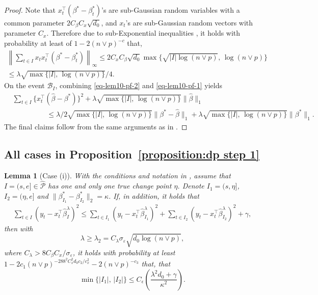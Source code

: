 \documentclass[twoside]{article}
\newtheorem{lemma}[theorem]{Lemma}
\begin{document}
\begin{proof}
Note that $x_t^{\top}(\beta^* - \beta^*_t)$'s are sub-Gaussian random variables with a common parameter $2C_{\beta}C_x\sqrt{d_0}$, and $x_t$'s are sub-Gaussian random vectors with parameter $C_x$.  Therefore due to sub-Exponential inequalities \citep[e.g. Proposition~2.7.1 in][]{vershynin2018high}, it holds with probability at least of $1 - 2(n \vee p)^{-c}$ that,
	\begin{align}
		\left\|\sum_{t \in I} x_t x_t^\top (\beta^*  -\beta^*_t) \right\|_{\infty} \leq 2C_x C_{\beta}\sqrt{d_0}\max\{\sqrt{|I|\log(n \vee p)}, \, \log(n \vee p)\}\nonumber \\
		\leq \lambda \sqrt{\max\{|I|, \, \log(n \vee p)\}}/4.\label{eq-lem10-pf-1}
	\end{align}
	On the event $\mathcal{B}_I$, combining \eqref{eq-lem10-pf-2} and \eqref{eq-lem10-pf-1} yields
	\begin{align*}
		&\sum_{t \in I} \bigl\{x_t^{\top}(\widehat{\beta} - \beta^*)\bigr\}^2 + \lambda \sqrt{\max\{|I|, \, \log(n \vee p)\}} \bigl\|\widehat{\beta}\bigr\|_1 \\
		&\hspace{2cm}\leq \lambda/2 \sqrt{\max\{|I|, \, \log(n \vee p)\}} \bigl\|\beta^* - \widehat{\beta}\bigr\|_1 + \lambda \sqrt{\max\{|I|, \, \log(n \vee p)\}} \bigl\|\beta^*\bigr\|_1. 
	\end{align*}
	The final claims follow from the same arguments as in .
\end{proof}


\subsection{All cases in Proposition~\ref{proposition:dp step 1}}

\begin{lemma}[Case (i)]\label{lemma:one change point} 
With the conditions and notation in , assume that $I = (s, e] \in \widehat{\mathcal{P}}$ has one and only one true change point $\eta$.  Denote $I_1 = (s, \eta]$, $I_2 = (\eta, e]$ and $\|\beta_{I_1}^* - \beta_{I_2}^*\|_2 = \kappa$.  If, in addition, it holds that  
	\begin{align}\label{eq:one change point} 
		\sum_{t \in I}(y_t - x_t^{\top}\widehat{\beta}^\lambda_I)^2 \leq \sum_{t \in I_1}(y_t - x_t^{\top}\widehat{\beta}^\lambda_{I_1})^2 + \sum_{t \in I_2}(y_t - x_t^{\top}\widehat{\beta}^\lambda_{I_2})^2 + \gamma,
	\end{align}
	then with 
	\[
		\lambda \geq \lambda_2 = C_{\lambda}\sigma_{\varepsilon} \sqrt{d_0 \log(n \vee p)}, 
	\]
	where $C_{\lambda} > 8C_{\beta}C_x/\sigma_{\varepsilon}$, it holds with probability at least $1 - 2c_1 (n \vee p)^{-288^2C_x^2d_0c_2/c_x^2} - 2(n \vee p)^{-c_3}$ that, that
	\[
		\min\{|I_1 |,\, |I_2|\} \leq C_{\epsilon} \left(\frac{\lambda^2 d_0 + \gamma}{\kappa^2}\right).
	\]
\end{lemma} 
\end{document}

